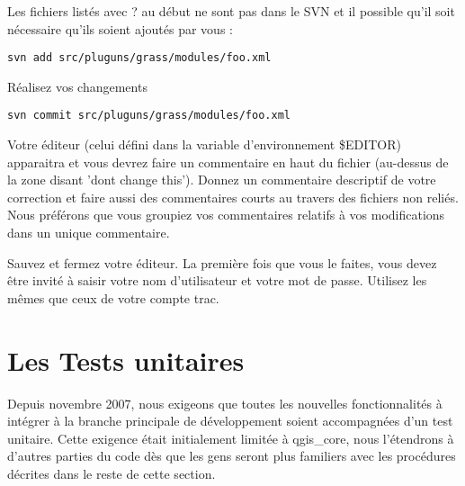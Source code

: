 Les fichiers list\'es avec ? au d\'ebut ne sont pas dans le SVN et il possible qu'il soit n\'ecessaire qu'ils soient ajout\'es par vous :

\begin{verbatim}
svn add src/pluguns/grass/modules/foo.xml
\end{verbatim}

R\'ealisez vos changements

\begin{verbatim}
svn commit src/pluguns/grass/modules/foo.xml
\end{verbatim}

Votre \'editeur (celui d\'efini dans la variable d'environnement \$EDITOR) apparaitra et vous devrez faire un commentaire en haut du fichier (au-dessus de la zone disant 'dont change this'). Donnez un commentaire descriptif de votre correction et faire aussi des commentaires courts au travers des fichiers non reli\'es. Nous pr\'ef\'erons que vous groupiez vos commentaires relatifs \`a vos modifications dans un unique commentaire.

Sauvez et fermez votre \'editeur. La premi\`ere fois que vous le faites, vous devez \^etre invit\'e \`a saisir votre nom d'utilisateur et votre mot de passe. Utilisez les m\^emes que ceux de votre compte trac.

\section{Les Tests unitaires}
Depuis novembre 2007, nous exigeons que toutes les nouvelles fonctionnalit\'es \`a int\'egrer \`a la branche principale de d\'eveloppement soient accompagn\'ees d'un test unitaire. Cette exigence \'etait initialement limit\'ee \`a qgis\_core, nous l'\'etendrons \`a d'autres parties du code d\`es que les gens seront plus familiers avec les proc\'edures d\'ecrites dans le reste de cette section.

